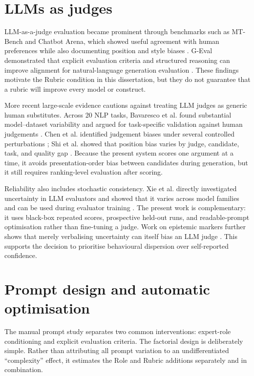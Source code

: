 \documentclass[11pt,twoside,a4paper]{report}
\begin{document}
\section{LLMs as judges}

LLM-as-a-judge evaluation became prominent through benchmarks such as MT-Bench and
Chatbot Arena, which showed useful agreement with human preferences while also
documenting position and style biases \cite{zheng2023judging}.  G-Eval demonstrated
that explicit evaluation criteria and structured reasoning can improve alignment for
natural-language generation evaluation \cite{liu2023geval}.  These findings motivate
the Rubric condition in this dissertation, but they do not guarantee that a rubric
will improve every model or construct.

More recent large-scale evidence cautions against treating LLM judges as generic
human substitutes.  Across 20 NLP tasks, Bavaresco et al. found substantial
model--dataset variability and argued for task-specific validation against human
judgements \cite{bavaresco2025llmjudges}.  Chen et al. identified judgement biases
under several controlled perturbations \cite{chen2024judgement}; Shi et al. showed
that position bias varies by judge, candidate, task, and quality gap
\cite{shi2025positionbias}.  Because the present system scores one argument at a
time, it avoids presentation-order bias between candidates during generation, but it
still requires ranking-level evaluation after scoring.

Reliability also includes stochastic consistency.  Xie et al. directly investigated
uncertainty in LLM evaluators and showed that it varies across model families and can
be used during evaluator training \cite{xie2025evaluatoruncertainty}.  The present
work is complementary: it uses black-box repeated scores, prospective held-out runs,
and readable-prompt optimisation rather than fine-tuning a judge.  Work on epistemic
markers further shows that merely verbalising uncertainty can itself bias an LLM
judge \cite{lee2025epistemicmarkers}.  This supports the decision to prioritise
behavioural dispersion over self-reported confidence.

\section{Prompt design and automatic optimisation}

The manual prompt study separates two common interventions: expert-role
conditioning and explicit evaluation criteria.  The factorial design is deliberately
simple.  Rather than attributing all prompt variation to an undifferentiated
``complexity'' effect, it estimates the Role and Rubric additions separately and in
combination.
\end{document}
